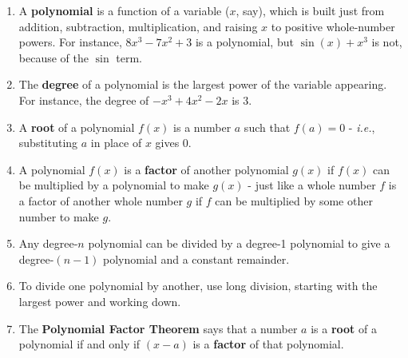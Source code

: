 \documentclass{article}
\begin{document}
\begin{enumerate}
\item A {\bf polynomial} is a function of a variable ($x$, say), which is built just from addition, subtraction, multiplication, and raising $x$ to positive whole-number powers. For instance, $8x^3-7x^2+3$ is a polynomial, but $\sin(x)+x^3$ is not, because of the $\sin$ term.
\item The {\bf degree} of a polynomial is the largest power of the variable appearing. For instance, the degree of $-x^3+4x^2-2x$ is 3.
\item A {\bf root} of a polynomial $f(x)$ is a number $a$ such that $f(a)=0$ - \textit{i.e.}, substituting $a$ in place of $x$ gives 0.
\item A polynomial $f(x)$ is a {\bf factor} of another polynomial $g(x)$ if $f(x)$ can be multiplied by a polynomial to make $g(x)$ - just like a whole number $f$ is a factor of another whole number $g$ if $f$ can be multiplied by some other number to make $g$.
\item Any degree-$n$ polynomial can be divided by a degree-1 polynomial to give a degree-$(n-1)$ polynomial and a constant remainder.
\item To divide one polynomial by another, use long division, starting with the largest power and working down.
\item The {\bf Polynomial Factor Theorem} says that a number $a$ is a {\bf root} of a polynomial if and only if $(x-a)$ is a {\bf factor} of that polynomial.
\end{enumerate}
\end{document}

